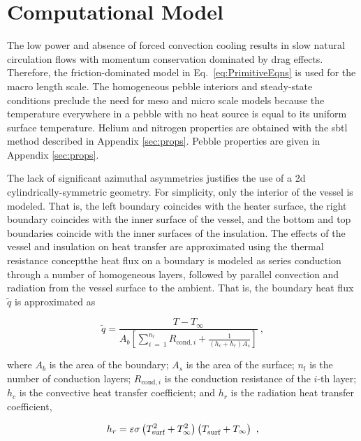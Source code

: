 \section{Computational Model}
\label{sec:model}

The low power and absence of forced convection cooling results in slow natural circulation flows with momentum conservation dominated by drag effects. Therefore, the friction-dominated model in Eq.\ \eqref{eq:PrimitiveEqns} is used for the macro length scale. The homogeneous pebble interiors and steady-state conditions preclude the need for meso and micro scale models because the temperature everywhere in a pebble with no heat source is equal to its uniform surface temperature. Helium and nitrogen properties are obtained with the \gls{sbtl} method described in Appendix \ref{sec:props}. Pebble properties are given in Appendix \ref{sec:props}.

The lack of significant azimuthal asymmetries justifies the use of a \gls{2d} cylindrically-symmetric geometry. For simplicity, only the interior of the vessel is modeled. That is, the left boundary coincides with the heater surface, the right boundary coincides with the inner surface of the vessel, and the bottom and top boundaries coincide with the inner surfaces of the insulation. The effects of the vessel and insulation on heat transfer are approximated using the thermal resistance concept\mdash the heat flux on a boundary is modeled as series conduction through a number of homogeneous layers, followed by parallel convection and radiation from the vessel surface to the ambient. That is, the boundary heat flux \(\tilde{q}\) is approximated as

\begin{equation}
\label{eq:ThermalResistanceBC}
\tilde{q}=\frac{T-T_\infty}{A_b\left\lbrack\sum_{i\ =\ 1}^{n_l}R_{\text{cond},i}+\frac{1}{\left(h_c+h_r\right)A_s}\right\rbrack}\ ,
\end{equation}

\noindent where \(A_b\) is the area of the boundary; \(A_s\) is the area of the surface; \(n_l\) is the number of conduction layers; \(R_{\text{cond},i}\) is the conduction resistance of the \(i\)-th layer; \(h_c\) is the convective heat transfer coefficient; and \(h_r\) is the radiation heat transfer coefficient,

\begin{equation}
\label{eq:RadiationHTC}
h_r=\varepsilon\sigma\left(T_\text{surf}^2+T_\infty^2\right)\left(T_\text{surf}^{\color{white}1\color{black}}+T_\infty\right)\ ,
\end{equation}

